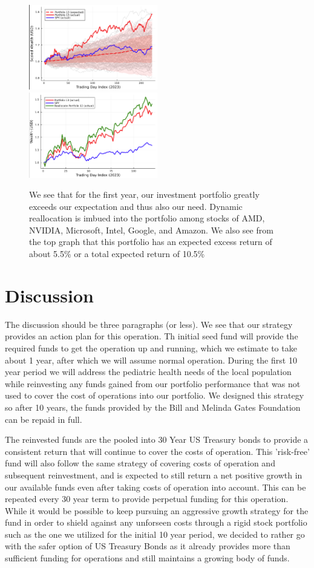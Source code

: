 \documentclass[10pt,twocolumn,twoside,final]{IEEEtran}
\begin{document}
\begin{figure}[!h]\centering
\includegraphics[width=0.5\textwidth]{./figs/year1expected.png}
\includegraphics[width=0.5\textwidth]{./figs/year1reallocated.png}
\caption{We see that for the first year, our investment portfolio greatly exceeds our expectation and thus also our need. Dynamic reallocation is imbued into the portfolio among stocks of AMD, NVIDIA, Microsoft, Intel, Google, and Amazon. We also see from the top graph that this portfolio has an expected excess return of about 5.5\% or a total expected return of 10.5\%}
\end{figure}

\section{Discussion}
The discussion should be three paragraphs (or less). 
We see that our strategy provides an action plan for this operation. Th initial seed fund will provide the required funds to get the operation up and running, which we estimate to take about 1 year, after which we will assume normal operation. During the first 10 year period we will address the pediatric health needs of the local population while reinvesting any funds gained from our portfolio performance that was not used to cover the cost of operations into our portfolio. We designed this strategy so after 10 years, the funds provided by the Bill and Melinda Gates Foundation can be repaid in full. 

The reinvested funds are the pooled into 30 Year US Treasury bonds to provide a consistent return that will continue to cover the costs of operation. This 'risk-free' fund will also follow the same strategy of covering costs of operation and subsequent reinvestment, and is expected to still return a net positive growth in our available funds even after taking costs of operation into account. This can be repeated every 30 year term to provide perpetual funding for this operation. While it would be possible to keep pursuing an aggressive growth strategy for the fund in order to shield against any unforseen costs through a rigid stock portfolio such as the one we utilized for the initial 10 year period, we decided to rather go with the safer option of US Treasury Bonds as it already provides more than sufficient funding for operations and still maintains a growing body of funds.
\end{document}
